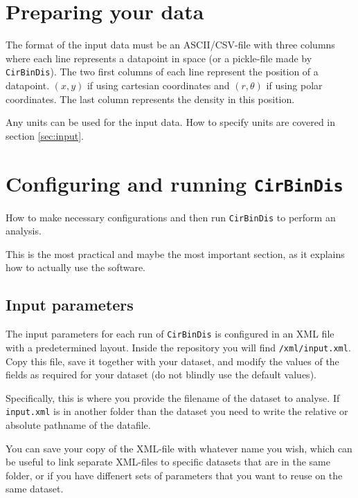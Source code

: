 \documentclass[a4paper, 12pt, english, titlepage]{article}
\newcommand{\sname}{\texttt{CirBinDis}\xspace}
\begin{document}
\section{Preparing your data}

The format of the input data must be an ASCII/CSV-file with three columns where each line represents a datapoint in space (or a pickle-file made by \sname). The two first columns of each line represent the position of a datapoint. $(x, y)$ if using cartesian coordinates and $(r, \theta)$ if using polar coordinates. The last column represents the density in this position.

Any units can be used for the input data. How to specify units are covered in section \vref{sec:input}.



\section{Configuring and running \sname}

How to make necessary configurations and then run \sname to perform an analysis.

This is the most practical and maybe the most important section, as it explains how to actually use the software.

\subsection{Input parameters}
    \label{sec:input}

    The input parameters for each run of \sname is configured in an XML file with a predetermined layout.
    Inside the repository you will find \texttt{/xml/input.xml}. Copy this file, save it together with your dataset, and modify the values of the fields as required for your dataset (do not blindly use the default values).

    Specifically, this is where you provide the filename of the dataset to analyse.
    If \texttt{input.xml} is in another folder than the dataset you need to write the relative or absolute pathname of the datafile.

    You can save your copy of the XML-file with whatever name you wish, which can be useful to link separate XML-files to specific datasets that are in the same folder, or if you have diffenert sets of parameters that you want to reuse on the same dataset.
\end{document}
